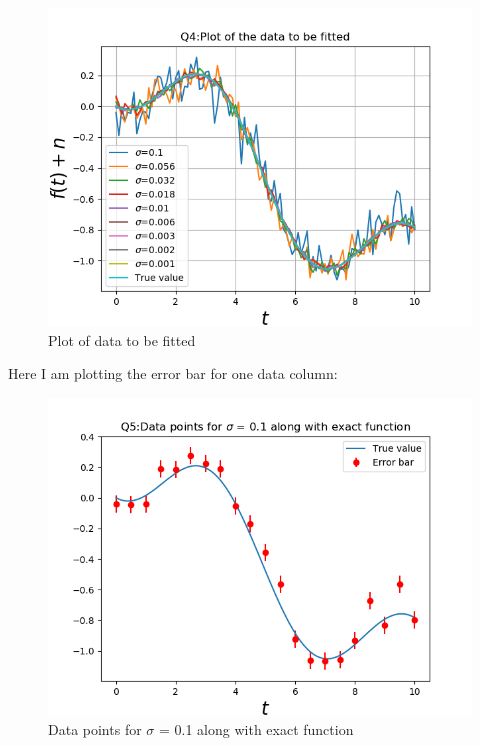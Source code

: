 \documentclass[11pt, a4paper]{article}
\begin{document}
\begin{figure}[!tbh]
   	\centering
   	\includegraphics[scale=0.4]{q4_plot.png}  %
   	\caption{Plot of data to be fitted}
   	\label{fig:Data plot}
   \end{figure} 
\newpage
Here I am plotting the error bar for one data column:\\
\begin{figure}[!tbh]
   	\centering
   	\includegraphics[scale=0.4]{q5_plot.png}  %
   	\caption{Data points for $\sigma$ = 0.1 along with exact function}
   	\label{fig:Error bar}
   \end{figure}
   
\end{document}
